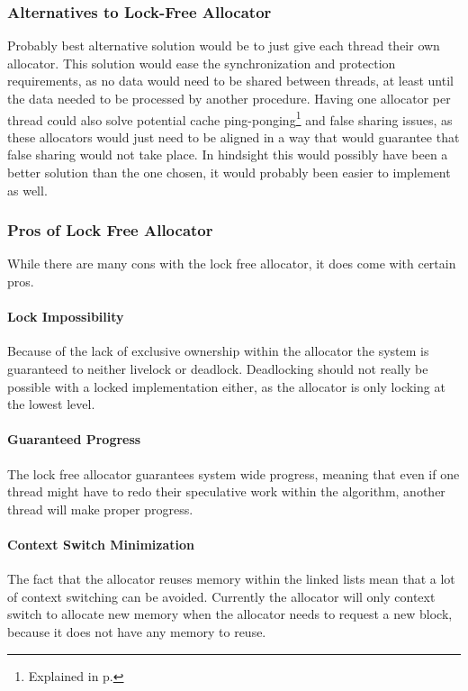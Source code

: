 \subsubsection{Alternatives to Lock-Free Allocator}
Probably best alternative solution would be to just give each thread their own allocator.
This solution would ease the synchronization and protection requirements, as no data would need to be shared between threads,
at least until the data needed to be processed by another procedure.
Having one allocator per thread could also solve potential cache ping-ponging\footnote{Explained in p.\pageref{detailed_lock_free_ping_pong}}
and false sharing issues, as these allocators
would just need to be aligned in a way that would guarantee that false sharing would not take place.
In hindsight this would possibly have been a better solution than the one chosen, it would probably been easier to implement as well.

\subsubsection{Pros of Lock Free Allocator}
While there are many cons with the lock free allocator, it does come with certain pros.

\paragraph{Lock Impossibility}
Because of the lack of exclusive ownership within the allocator the system is guaranteed to neither livelock or deadlock.
Deadlocking should not really be possible with a locked implementation either, as the allocator is only locking at the lowest level.

\paragraph{Guaranteed Progress}
The lock free allocator guarantees system wide progress, meaning that even if one thread might have to redo their speculative work
within the algorithm, another thread will make proper progress.

\paragraph{Context Switch Minimization}
The fact that the allocator reuses memory within the linked lists mean that a lot of context switching can be avoided.
Currently the allocator will only context switch to allocate new memory when the allocator needs to request a new block,
because it does not have any memory to reuse.


